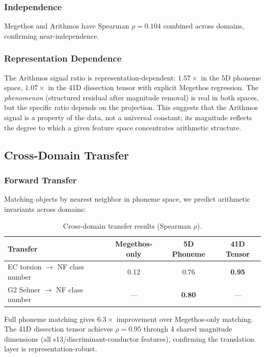 \documentclass[11pt,a4paper]{article}
\begin{document}
\subsubsection{Independence}

Megethos and Arithmos have Spearman $\rho = 0.104$ combined across domains, confirming near-independence.

\subsubsection{Representation Dependence}

The Arithmos signal ratio is representation-dependent: $1.57\times$ in the 5D phoneme space, $1.07\times$ in the 41D dissection tensor with explicit Megethos regression. The \emph{phenomenon} (structured residual after magnitude removal) is real in both spaces, but the specific ratio depends on the projection. This suggests that the Arithmos signal is a property of the data, not a universal constant; its magnitude reflects the degree to which a given feature space concentrates arithmetic structure.

\subsection{Cross-Domain Transfer}

\subsubsection{Forward Transfer}

Matching objects by nearest neighbor in phoneme space, we predict arithmetic invariants across domains:

\begin{table}[h]
\centering
\caption{Cross-domain transfer results (Spearman $\rho$).}
\label{tab:transfer}
\begin{tabular}{lccc}
\toprule
Transfer & Megethos-only & 5D Phoneme & 41D Tensor \\
\midrule
EC torsion $\to$ NF class number & 0.12 & 0.76 & \textbf{0.95} \\
G2 Selmer $\to$ NF class number & --- & \textbf{0.80} & --- \\
\bottomrule
\end{tabular}
\end{table}

Full phoneme matching gives $6.3\times$ improvement over Megethos-only matching. The 41D dissection tensor achieves $\rho = 0.95$ through 4 shared magnitude dimensions (all s13/discriminant-conductor features), confirming the translation layer is representation-robust.
\end{document}
